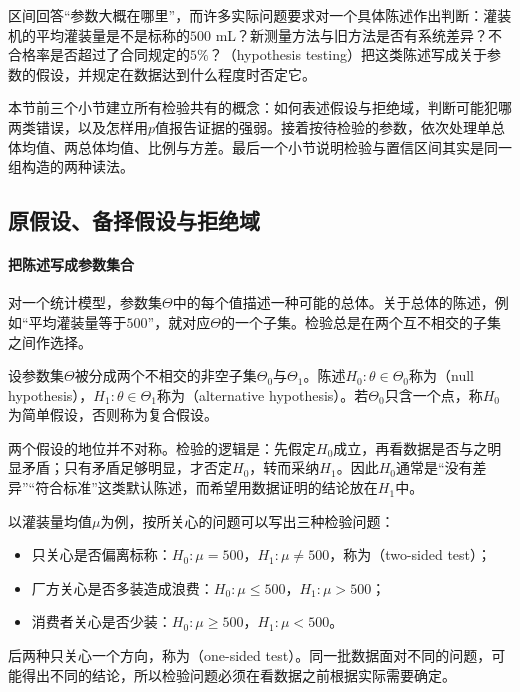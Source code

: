 区间回答“参数大概在哪里”，而许多实际问题要求对一个具体陈述作出判断：灌装机的平均灌装量是不是标称的$500$ mL？新测量方法与旧方法是否有系统差异？不合格率是否超过了合同规定的$5\%$？（hypothesis testing）把这类陈述写成关于参数的假设，并规定在数据达到什么程度时否定它。

本节前三个小节建立所有检验共有的概念：如何表述假设与拒绝域，判断可能犯哪两类错误，以及怎样用$p$值报告证据的强弱。接着按待检验的参数，依次处理单总体均值、两总体均值、比例与方差。最后一个小节说明检验与置信区间其实是同一组构造的两种读法。

\subsection{原假设、备择假设与拒绝域}

\paragraph{把陈述写成参数集合}

对一个统计模型，参数集$\Theta$中的每个值描述一种可能的总体。关于总体的陈述，例如“平均灌装量等于$500$”，就对应$\Theta$的一个子集。检验总是在两个互不相交的子集之间作选择。

\begin{definition}[原假设与备择假设]
\label{def:pred-hypotheses}
设参数集$\Theta$被分成两个不相交的非空子集$\Theta_0$与$\Theta_1$。陈述$H_0:\theta\in\Theta_0$称为（null hypothesis），$H_1:\theta\in\Theta_1$称为（alternative hypothesis）。若$\Theta_0$只含一个点，称$H_0$为简单假设，否则称为复合假设。
\end{definition}

两个假设的地位并不对称。检验的逻辑是：先假定$H_0$成立，再看数据是否与之明显矛盾；只有矛盾足够明显，才否定$H_0$，转而采纳$H_1$。因此$H_0$通常是“没有差异”“符合标准”这类默认陈述，而希望用数据证明的结论放在$H_1$中。

以灌装量均值$\mu$为例，按所关心的问题可以写出三种检验问题：
\begin{itemize}
  \item 只关心是否偏离标称：$H_0:\mu=500$，$H_1:\mu\neq500$，称为（two-sided test）；
  \item 厂方关心是否多装造成浪费：$H_0:\mu\leq500$，$H_1:\mu>500$；
  \item 消费者关心是否少装：$H_0:\mu\geq500$，$H_1:\mu<500$。
\end{itemize}
后两种只关心一个方向，称为（one-sided test）。同一批数据面对不同的问题，可能得出不同的结论，所以检验问题必须在看数据之前根据实际需要确定。

